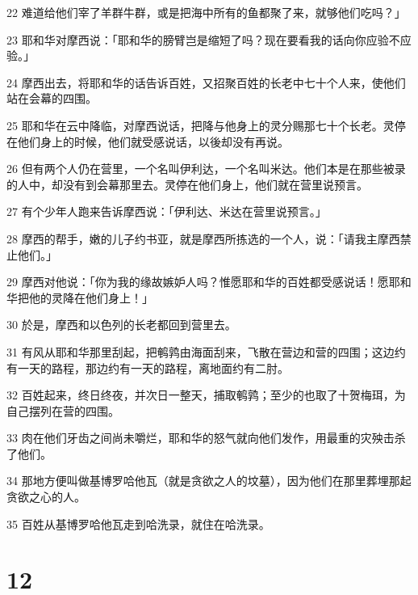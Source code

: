 \par 22 难道给他们宰了羊群牛群，或是把海中所有的鱼都聚了来，就够他们吃吗？」
\par 23 耶和华对摩西说：「耶和华的膀臂岂是缩短了吗？现在要看我的话向你应验不应验。」
\par 24 摩西出去，将耶和华的话告诉百姓，又招聚百姓的长老中七十个人来，使他们站在会幕的四围。
\par 25 耶和华在云中降临，对摩西说话，把降与他身上的灵分赐那七十个长老。灵停在他们身上的时候，他们就受感说话，以後却没有再说。
\par 26 但有两个人仍在营里，一个名叫伊利达，一个名叫米达。他们本是在那些被录的人中，却没有到会幕那里去。灵停在他们身上，他们就在营里说预言。
\par 27 有个少年人跑来告诉摩西说：「伊利达、米达在营里说预言。」
\par 28 摩西的帮手，嫩的儿子约书亚，就是摩西所拣选的一个人，说：「请我主摩西禁止他们。」
\par 29 摩西对他说：「你为我的缘故嫉妒人吗？惟愿耶和华的百姓都受感说话！愿耶和华把他的灵降在他们身上！」
\par 30 於是，摩西和以色列的长老都回到营里去。
\par 31 有风从耶和华那里刮起，把鹌鹑由海面刮来，飞散在营边和营的四围；这边约有一天的路程，那边约有一天的路程，离地面约有二肘。
\par 32 百姓起来，终日终夜，并次日一整天，捕取鹌鹑；至少的也取了十贺梅珥，为自己摆列在营的四围。
\par 33 肉在他们牙齿之间尚未嚼烂，耶和华的怒气就向他们发作，用最重的灾殃击杀了他们。
\par 34 那地方便叫做基博罗哈他瓦（就是贪欲之人的坟墓），因为他们在那里葬埋那起贪欲之心的人。
\par 35 百姓从基博罗哈他瓦走到哈洗录，就住在哈洗录。

\chapter{12}

